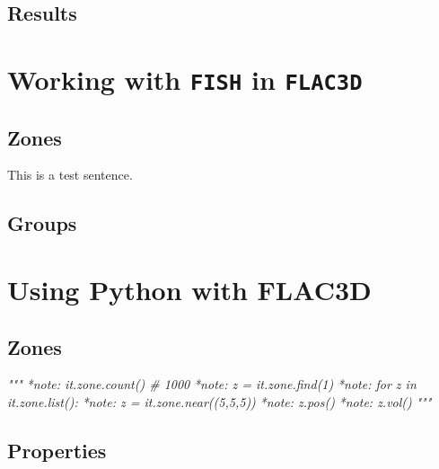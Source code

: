 \documentclass[a4paper, nobind]{templates/ociamthesis}
\newenvironment{Shaded}{\begin{snugshade}}{\end{snugshade}}
\newcommand{\CommentTok}[1]{\textcolor[rgb]{0.56,0.35,0.01}{\textit{#1}}}
\renewenvironment{Shaded}
{
  \vspace{10pt}%
  \begin{snugshade}%
}{%
  \end{snugshade}%
  \vspace{8pt}%
}
\begin{document}
\hypertarget{results}{%
\section{Results}\label{results}}

\newpage

\hypertarget{working-with-fish-in-flac3d}{%
\chapter{\texorpdfstring{Working with \texttt{FISH} in \texttt{FLAC3D}}{Working with FISH in FLAC3D}}\label{working-with-fish-in-flac3d}}

\hypertarget{zones-1}{%
\section{Zones}\label{zones-1}}

This is a test sentence.

\hypertarget{groups-1}{%
\section{Groups}\label{groups-1}}

\newpage

\hypertarget{using-python-with-flac3d}{%
\chapter{Using Python with FLAC3D}\label{using-python-with-flac3d}}

\hypertarget{zones-2}{%
\section{Zones}\label{zones-2}}

\begin{Shaded}
\begin{Highlighting}[]
\CommentTok{"""}
\CommentTok{*note: it.zone.count() \# 1000}
\CommentTok{*note: z = it.zone.find(1)}
\CommentTok{*note: for z in it.zone.list():}
\CommentTok{*note: z = it.zone.near((5,5,5))}
\CommentTok{*note: z.pos()}
\CommentTok{*note: z.vol()}
\CommentTok{"""}
\end{Highlighting}
\end{Shaded}

\hypertarget{properties-1}{%
\section{Properties}\label{properties-1}}
\end{document}
